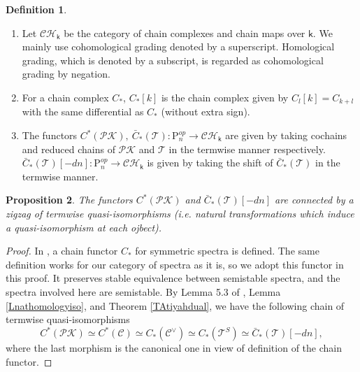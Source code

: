 \documentclass[reqno]{amsart}
\theoremstyle{definition}
\newtheorem{defi}{Definition}[section]
\theoremstyle{plain}
\newtheorem{prop}[defi]{Proposition}
\newcommand{\TT}{\mathcal{T}} %
\newcommand{\PK}{\mathcal{PK}} %
\newcommand{\CH}{\mathcal{CH}}%
\newcommand{\kk}{\mathsf{k}}
\newcommand{\PP}{\mathrm{P}} %
\begin{document}
\begin{defi}\label{Dchain_spectra}
\begin{enumerate}
\item Let $\CH_{\kk}$ be the category of chain complexes and chain maps over  $\kk$. We mainly use cohomological grading denoted by a superscript.  Homological grading, which is denoted by a subscript, is regarded as  cohomological grading by negation.
\item For a chain complex $C_*$, $C_*[k]$ is the chain complex given by $C_l[k]=C_{k+l}$ with the same differential as $C_*$ (without extra sign).
\item The functors $C^*(\PK),\ \bar C_*(\TT):\PP_n^{op}\to \CH_{\kk}$ are given by taking cochains and reduced chains of $\PK$ and $\TT$ in the termwise manner respectively. $\bar C_*(\TT)[-dn]:\PP_n^{op}\to \CH_{\kk}$ is given by taking the shift of $\bar C_*(\TT)$ in the termwise manner.  
\end{enumerate}
\end{defi}
\begin{prop}\label{Phom_dual}
The functors $C^*(\PK)$ and $\bar C_*(\TT)[-dn]$ are connected by  a zigzag of termwise quasi-isomorphisms (i.e. natural transformations which induce a quasi-isomorphism at each ojbect).  
\end{prop}
\begin{proof}
In \cite{moriya1}, a chain functor $C_*$ for symmetric spectra is defined. The same definition works for our category of spectra as it is, so we adopt this functor in this proof.  It preserves stable equivalence between semistable spectra, and the spectra involved here are semistable.  By Lemma 5.3 of \cite{moriya1}, Lemma \ref{Lnathomologyiso}, and Theorem \ref{TAtiyahdual}, we have the following chain of termwise quasi-isomorphisms
\[
C^*(\PK)\simeq C^*(\mathcal{C})\simeq C_*(\mathcal{C}^\vee)\simeq C_*(\TT^S)\simeq \bar C_*(\TT)[-dn],
\]
where the last morphism is the canonical one in view of definition of the chain functor.
\end{proof}
\end{document}
